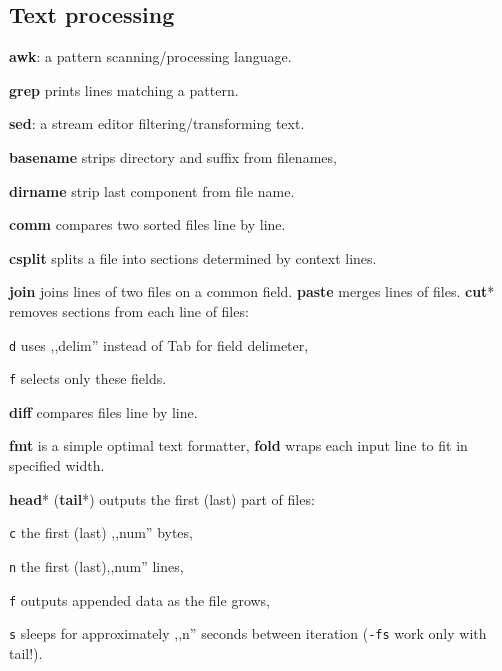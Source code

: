 \subsection*{Text processing}
\begin{enumx}
	\item [\cmd] \textbf{awk}: a pattern scanning/processing language.
	\item [\cmd] \textbf{grep} prints lines matching a pattern.
	\item [\cmd] \textbf{sed}: a stream editor filtering/transforming text.
\end{enumx}


\begin{enumx}
	\item [\cmd] \textbf{basename} strips directory and suffix from filenames, 
	\item [\cmd] \textbf{dirname} strip last component from file name.
\end{enumx}

\textbf{comm} compares two sorted files line by line.

\textbf{csplit} splits a file into sections determined by context lines.

\textbf{join} joins lines of two files on a common field.
\textbf{paste} merges lines of files.
\textbf{cut}* removes sections from each line of files:
\begin{enumx}
	\item [\texttt{d}] uses ,,delim'' instead of Tab for field delimeter,
	\item [\texttt{f}] selects only these fields.
\end{enumx}

\textbf{diff} compares files line by line.


\textbf{fmt} is a simple optimal text formatter, 
\textbf{fold} wraps each input line to fit in specified width.

\textbf{head}* (\textbf{tail}*) outputs the first (last) part of files:
\begin{enumx}
	\item [\texttt{c}] the first (last) ,,num'' bytes,
	\item [\texttt{n}] the first (last),,num'' lines,
	\item [\texttt{f}] outputs appended data as the file grows,
	\item [\texttt{s}] sleeps for approximately ,,n'' seconds between iteration 
	                   (\texttt{-fs} work only with tail!).
\end{enumx}

